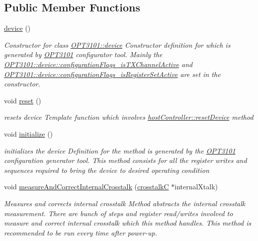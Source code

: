\subsection*{Public Member Functions}
\begin{DoxyCompactItemize}
\item 
\mbox{\hyperlink{class_o_p_t3101_1_1device_a10acd9ff9c81c5d113d72a331ced450b}{device}} ()
\begin{DoxyCompactList}\small\item\em Constructor for class \mbox{\hyperlink{class_o_p_t3101_1_1device}{O\+P\+T3101\+::device}} Constructor definition for which is generated by \mbox{\hyperlink{namespace_o_p_t3101}{O\+P\+T3101}} configurator tool. Mainly the \mbox{\hyperlink{class_o_p_t3101_1_1device_aa911b5cc3747694d63c55a84b84dccd5}{O\+P\+T3101\+::device\+::configuration\+Flags\+\_\+is\+T\+X\+Channel\+Active}} and \mbox{\hyperlink{class_o_p_t3101_1_1device_a11813c9f13a5c970aa70d3318c4118b1}{O\+P\+T3101\+::device\+::configuration\+Flags\+\_\+is\+Register\+Set\+Active}} are set in the constructor. \end{DoxyCompactList}\item 
void \mbox{\hyperlink{class_o_p_t3101_1_1device_a1d37b22f535d8130c7f24799f7fa3c33}{reset}} ()
\begin{DoxyCompactList}\small\item\em resets device Template function which involves \mbox{\hyperlink{classhost_controller_aa9f25eaf4a9bda5213c70ff91c261649}{host\+Controller\+::reset\+Device}} method \end{DoxyCompactList}\item 
void \mbox{\hyperlink{class_o_p_t3101_1_1device_ae3b7fb4f9a8f1dee330523e034aa9460}{initialize}} ()
\begin{DoxyCompactList}\small\item\em initializes the device Definition for the method is generated by the \mbox{\hyperlink{namespace_o_p_t3101}{O\+P\+T3101}} configuration generator tool. This method consists for all the register writes and sequences required to bring the device to desired operating condition \end{DoxyCompactList}\item 
void \mbox{\hyperlink{class_o_p_t3101_1_1device_a44f832d6edbfb26db079ddba4debfdba}{measure\+And\+Correct\+Internal\+Crosstalk}} (\mbox{\hyperlink{class_o_p_t3101_1_1crosstalk_c}{crosstalkC}} $\ast$internal\+Xtalk)
\begin{DoxyCompactList}\small\item\em Measures and corrects internal crosstalk Method abstracts the internal crosstalk measurement. There are bunch of steps and register read/writes involved to measure and correct internal crosstalk which this method handles. This method is recommended to be run every time after power-\/up. \end{DoxyCompactList}\item 

\end{DoxyCompactItemize}

